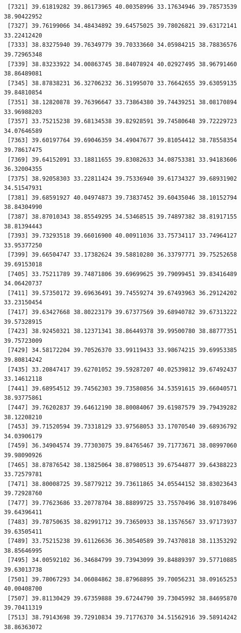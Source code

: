 \documentclass[
  letterpaper,
  DIV=11,
  numbers=noendperiod]{scrartcl}
\begin{document}
\begin{verbatim}
 [7321] 39.61819282 39.86173965 40.00358996 33.17634946 39.78573539 38.90422952
 [7327] 39.76199066 34.48434892 39.64575025 39.78026821 39.63172141 33.22412420
 [7333] 38.83275940 39.76349779 39.70333660 34.05984215 38.78836576 39.72965348
 [7339] 38.83233922 34.00863745 38.84078924 40.02927495 38.96791460 38.86489081
 [7345] 38.87838231 36.32706232 36.31995070 33.76642655 39.63059135 39.84810854
 [7351] 38.12820878 39.76396647 33.73864380 39.74439251 38.08170894 33.96988203
 [7357] 33.75215238 39.68134538 39.82928591 39.74580648 39.72229723 34.07646589
 [7363] 39.60197764 39.69046359 34.49047677 39.81054412 38.78558354 39.78617475
 [7369] 39.64152091 33.18811655 39.83082633 34.08753381 33.94183606 36.32004355
 [7375] 38.92058303 33.22811424 39.75336940 39.61734327 39.68931902 34.51547931
 [7381] 39.68591927 40.04974873 39.73837452 39.60435046 38.10152794 38.84304990
 [7387] 38.87010343 38.85549295 34.53468515 39.74897382 38.81917155 38.81394443
 [7393] 39.73293518 39.66016900 40.00911036 33.75734117 33.74964127 33.95377250
 [7399] 39.66504747 33.17382624 39.58810280 36.33797771 39.75252658 39.69153018
 [7405] 33.75211789 39.74871806 39.69699625 39.79099451 39.83416489 34.06420737
 [7411] 39.57350172 39.69636491 39.74559274 39.67493963 36.29124202 33.23150454
 [7417] 39.63427668 38.80223179 39.67377569 39.68940782 39.67313222 39.57328915
 [7423] 38.92450321 38.12371341 38.86449378 39.99500780 38.88777351 39.75723009
 [7429] 34.58172204 39.70526370 33.99119433 33.98674215 39.69953385 39.80814242
 [7435] 33.20847417 39.62701052 39.59287207 40.02539812 39.67492437 33.14612118
 [7441] 39.68954512 39.74562303 39.73580856 34.53591615 39.66040571 38.93775861
 [7447] 39.76202837 39.64612190 38.80084067 39.61987579 39.79439282 38.12208210
 [7453] 39.71520594 39.73318129 33.97568053 33.17070540 39.68936792 34.03906179
 [7459] 36.34904574 39.77303075 39.84765467 39.71773671 38.08997060 39.98090926
 [7465] 38.87876542 38.13825064 38.87980513 39.67544877 39.64388223 33.72579781
 [7471] 38.80008725 39.58779212 39.73611865 34.05544152 38.83023643 39.72928760
 [7477] 39.77623686 33.20778704 38.88899725 33.75570496 38.91078496 39.64396411
 [7483] 39.78750635 38.82991712 39.73650933 38.13576567 33.97173937 39.63505411
 [7489] 33.75215238 39.61126636 36.30540589 39.74370818 38.11353292 38.85646995
 [7495] 34.00592102 36.34684799 39.73943099 39.84889397 39.57710885 39.63013738
 [7501] 39.78067293 34.06084862 38.87968895 39.70056231 38.09165253 40.00408700
 [7507] 39.81130429 39.67359888 39.67244790 39.73045992 38.84695870 39.70411319
 [7513] 38.79143698 39.72910834 39.71776370 34.51562916 39.58914242 38.86363072

\end{verbatim}
\end{document}
